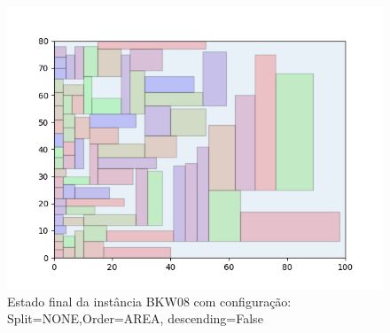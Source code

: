 \begin{figure}[H]
    \centering
    \caption[]{Estado final da instância BKW08 com configuração: Split=NONE,Order=AREA, descending=False}
    \label{fig:bkw08-none-area-false}
    \includegraphics[scale=0.5]{output/figures/bkw/bkw08/none/area/false/00}
\end{figure}